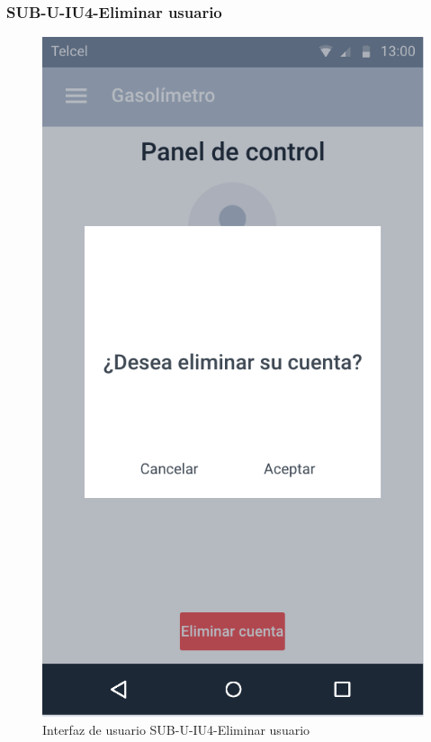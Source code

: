 \subsubsection{SUB-U-IU4-Eliminar usuario}\label{SUB-U-IU4}
\begin{figure}[H]
	\centering
	\includegraphics[scale=.55]{Capitulo4/software/submodulos/usuarios/images/sub-u-iu4}
	\caption{Interfaz de usuario SUB-U-IU4-Eliminar usuario}
	\label{fig:sub-u-iu4}
\end{figure}